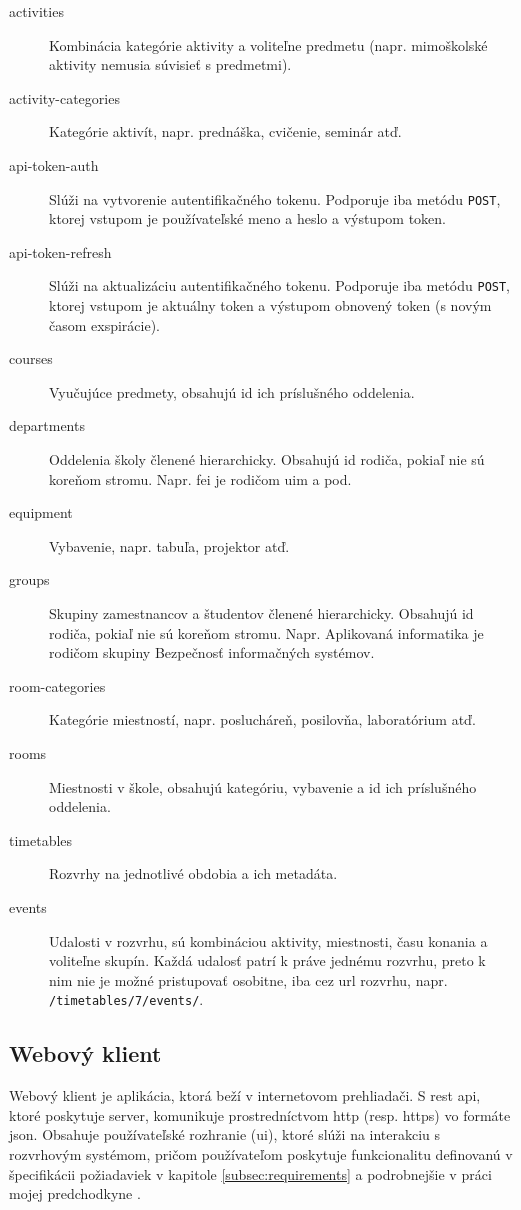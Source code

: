 \begin{description}
\item[activities] Kombinácia kategórie aktivity a voliteľne predmetu
  (napr. mimoškolské aktivity nemusia súvisieť s predmetmi).
\item[activity-categories] Kategórie aktivít, napr. prednáška, cvičenie, seminár
  atď.
\item[api-token-auth] Slúži na vytvorenie autentifikačného tokenu. Podporuje iba
  metódu \texttt{POST}, ktorej vstupom je používateľské meno a heslo a výstupom
  token.
\item[api-token-refresh] Slúži na aktualizáciu autentifikačného tokenu.
  Podporuje iba metódu \texttt{POST}, ktorej vstupom je aktuálny token a
  výstupom obnovený token (s novým časom exspirácie).
\item[courses] Vyučujúce predmety, obsahujú \acrshort{id} ich príslušného
  oddelenia.
\item[departments] Oddelenia školy členené hierarchicky. Obsahujú \acrshort{id}
  rodiča, pokiaľ nie sú koreňom stromu. Napr. \acrshort{fei} je rodičom
  \acrshort{uim} a pod.
\item[equipment] Vybavenie, napr. tabuľa, projektor atď.
\item[groups] Skupiny zamestnancov a študentov členené hierarchicky. Obsahujú
  \acrshort{id} rodiča, pokiaľ nie sú koreňom stromu. Napr. Aplikovaná
  informatika je rodičom skupiny Bezpečnosť informačných systémov.
\item[room-categories] Kategórie miestností, napr. poslucháreň, posilovňa,
  laboratórium atď.
\item[rooms] Miestnosti v škole, obsahujú kategóriu, vybavenie a \acrshort{id}
  ich príslušného oddelenia.
\item[timetables] Rozvrhy na jednotlivé obdobia a ich metadáta.
\item[events] Udalosti v rozvrhu, sú kombináciou aktivity, miestnosti, času
  konania a voliteľne skupín. Každá udalosť patrí k práve jednému rozvrhu, preto
  k nim nie je možné pristupovať osobitne, iba cez \acrshort{url} rozvrhu, napr.
  \texttt{/timetables/7/events/}.
\end{description}

\subsection{Webový klient}
\label{subsec:client_design}

Webový klient je aplikácia, ktorá beží v internetovom prehliadači. S
\acrshort{rest} \acrshort{api}, ktoré poskytuje server, komunikuje
prostredníctvom \acrshort{http} (resp. \acrshort{https}) vo formáte
\acrshort{json}. Obsahuje používateľské rozhranie (\acrshort{ui}), ktoré slúži
na interakciu s rozvrhovým systémom, pričom používateľom poskytuje funkcionalitu
definovanú v špecifikácii požiadaviek v kapitole \ref{subsec:requirements} a
podrobnejšie v práci mojej predchodkyne \cite{knap}.


